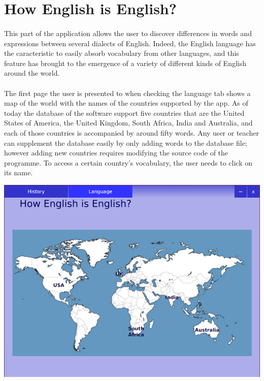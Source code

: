 \documentclass[11pt, a4paper]{report}
\begin{document}
\section*{How English is English?}
\paragraph{}This part of the application allows the user to discover differences in words and expressions between several dialects of English. Indeed, the English language has the caracteristic to easily absorb vocabulary from other languages, and this feature has brought to the emergence of a variety of different kinds of English around the world.

\paragraph{}The first page the user is presented to when checking the language tab shows a map of the world with the names of the countries supported by the app. As of today the database of the software support five countries that are the United States of America, the United Kingdom, South Africa, India and Australia, and each of those countries is accompanied by around fifty words. Any user or teacher can supplement the database easily by only adding words to the database file; however adding new countries requires modifying the source code of the programme. To access a certain country's vocabulary, the user needs to click on its name.

\centerline{\includegraphics[scale=0.5]{images/languageTab.png}}
\end{document}
